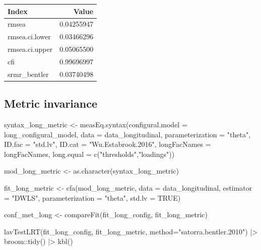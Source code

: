 \documentclass[
  letterpaper,
  DIV=11,
  numbers=noendperiod]{scrreprt}
\newenvironment{Shaded}{\begin{snugshade}}{\end{snugshade}}
\newcommand{\AttributeTok}[1]{\textcolor[rgb]{0.40,0.45,0.13}{#1}}
\newcommand{\ConstantTok}[1]{\textcolor[rgb]{0.56,0.35,0.01}{#1}}
\newcommand{\FunctionTok}[1]{\textcolor[rgb]{0.28,0.35,0.67}{#1}}
\newcommand{\NormalTok}[1]{\textcolor[rgb]{0.00,0.23,0.31}{#1}}
\newcommand{\OtherTok}[1]{\textcolor[rgb]{0.00,0.23,0.31}{#1}}
\newcommand{\SpecialCharTok}[1]{\textcolor[rgb]{0.37,0.37,0.37}{#1}}
\newcommand{\StringTok}[1]{\textcolor[rgb]{0.13,0.47,0.30}{#1}}
\begin{document}
\begin{tabular}[t]{l|r}
\hline
Index & Value\\
\hline
rmsea & 0.04255947\\
\hline
rmsea.ci.lower & 0.03466296\\
\hline
rmsea.ci.upper & 0.05065500\\
\hline
cfi & 0.99696997\\
\hline
srmr\_bentler & 0.03740498\\
\hline
\end{tabular}

\hypertarget{metric-invariance}{%
\subsection{Metric invariance}\label{metric-invariance}}

\begin{Shaded}
\begin{Highlighting}[]
\NormalTok{syntax\_long\_metric }\OtherTok{\textless{}{-}} \FunctionTok{measEq.syntax}\NormalTok{(}\AttributeTok{configural.model =}\NormalTok{ long\_configural\_model,}
                               \AttributeTok{data =}\NormalTok{ data\_longitudinal,}
                               \AttributeTok{parameterization =} \StringTok{"theta"}\NormalTok{,}
                               \AttributeTok{ID.fac =} \StringTok{"std.lv"}\NormalTok{, }\AttributeTok{ID.cat =} \StringTok{"Wu.Estabrook.2016"}\NormalTok{,}
                               \AttributeTok{longFacNames =}\NormalTok{ longFacNames,}
                               \AttributeTok{long.equal  =} \FunctionTok{c}\NormalTok{(}\StringTok{"thresholds"}\NormalTok{,}\StringTok{"loadings"}\NormalTok{))}

\NormalTok{mod\_long\_metric }\OtherTok{\textless{}{-}} \FunctionTok{as.character}\NormalTok{(syntax\_long\_metric)}

\NormalTok{fit\_long\_metric }\OtherTok{\textless{}{-}} \FunctionTok{cfa}\NormalTok{(mod\_long\_metric, }\AttributeTok{data =}\NormalTok{ data\_longitudinal, }\AttributeTok{estimator =} \StringTok{"DWLS"}\NormalTok{,}
                  \AttributeTok{parameterization =} \StringTok{"theta"}\NormalTok{, }\AttributeTok{std.lv =} \ConstantTok{TRUE}\NormalTok{)}

\NormalTok{conf\_met\_long }\OtherTok{\textless{}{-}} \FunctionTok{compareFit}\NormalTok{(fit\_long\_config, fit\_long\_metric)}

\FunctionTok{lavTestLRT}\NormalTok{(fit\_long\_config, fit\_long\_metric, }\AttributeTok{method=}\StringTok{"satorra.bentler.2010"}\NormalTok{) }\SpecialCharTok{|\textgreater{}} 
\NormalTok{  broom}\SpecialCharTok{::}\FunctionTok{tidy}\NormalTok{() }\SpecialCharTok{|\textgreater{}} 
  \FunctionTok{kbl}\NormalTok{()}
\end{Highlighting}
\end{Shaded}
\end{document}
